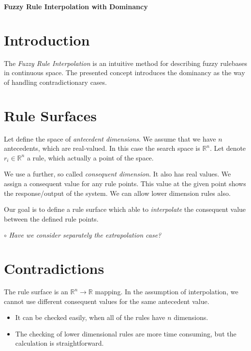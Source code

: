 \documentclass[a4paper,12pt]{article}
\newenvironment{question}[1]
{\noindent\textcolor{OliveGreen}{$\circ$ \textit{#1}}

\smallskip

\color{Gray}

}{\bigskip}
\begin{document}
\begin{center}
    \Large \textbf{Fuzzy Rule Interpolation with Dominancy}
\end{center}

\section{Introduction}

The \textit{Fuzzy Rule Interpolation} is an intuitive method for describing fuzzy rulebases in continuous space. The presented concept introduces the dominancy as the way of handling contradictionary cases.

\section{Rule Surfaces}

Let define the space of \textit{antecedent dimensions}. We assume that we have $n$ antecedents, which are real-valued. In this case the search space is $\mathbb{R}^n$. Let denote $r_i \in \mathbb{R}^n$ a rule, which actually a point of the space.

We use a further, so called \textit{consequent dimension}. It also has real values. We assign a consequent value for any rule points. This value at the given point shows the response/output of the system. We can allow lower dimension rules also.

Our goal is to define a rule surface which able to \textit{interpolate} the consequent value between the defined rule points.

\begin{question}{Have we consider separately the extrapolation case?}
\end{question}

\section{Contradictions}

The rule surface is an $\mathbb{R}^n \rightarrow \mathbb{R}$ mapping. In the assumption of interpolation, we cannot use different consequent values for the same antecedent value.
\begin{itemize}
\item It can be checked easily, when all of the rules have $n$ dimensions.
\item The checking of lower dimensional rules are more time consuming, but the calculation is straightforward.
\end{itemize}
\end{document}
